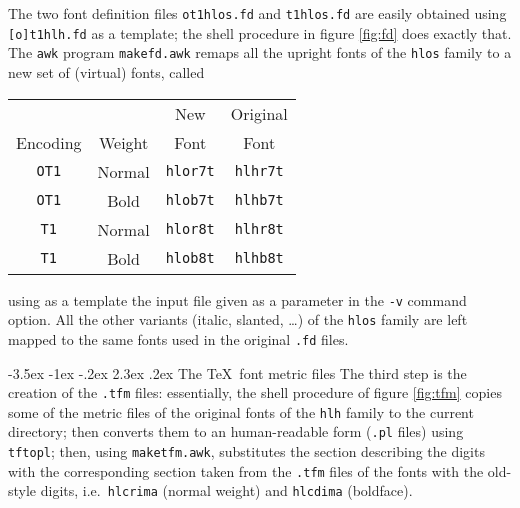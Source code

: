 \documentclass[a4paper]{article}
\makeatletter
\renewcommand{\section}{\@startsection {section}{1}{\z@}%
  {-3.5ex \@plus -1ex \@minus -.2ex}%
  {2.3ex \@plus.2ex}%
  {\normalfont\Large\sffamily\bfseries}}
\makeatother
\begin{document}
The two font definition files \verb|ot1hlos.fd| and
\verb|t1hlos.fd| are easily obtained using
\verb|[o]t1hlh.fd| as a template; the shell procedure in
figure \ref{fig:fd} does exactly that.
The \verb|awk| program \verb|makefd.awk| remaps all the
upright fonts of the \verb|hlos| family to a new set of
(virtual) fonts, called
\begin{center}
  \begin{tabular}{|c|c||c|c|}
    \hline
    & & New & Original \\
    Encoding & Weight & Font & Font \\
    \hline \hline
    \verb|OT1| & Normal & \verb|hlor7t| & \verb|hlhr7t| \\
    \verb|OT1| & Bold   & \verb|hlob7t| & \verb|hlhb7t| \\
    \verb|T1|  & Normal & \verb|hlor8t| & \verb|hlhr8t| \\
    \verb|T1|  & Bold   & \verb|hlob8t| & \verb|hlhb8t| \\
    \hline
  \end{tabular}
\end{center}
using as a template the input file given as a parameter in
the \verb|-v| command option.
All the other variants (italic, slanted, \ldots) of the
\verb|hlos| family are left mapped to the same fonts used in
the original \verb|.fd| files.

\section{The \TeX\ font metric files}
The third step is the creation of the \verb|.tfm| files:
essentially, the shell procedure of figure \ref{fig:tfm}
copies some of the metric files of the original fonts of the
\verb|hlh| family to the current directory; then converts
them to an human-readable form (\verb|.pl| files) using
\verb|tftopl|; then, using \verb|maketfm.awk|, substitutes
the section describing the digits with the corresponding
section taken from the \verb|.tfm| files of the fonts with
the old-style digits, i.e.\ \verb|hlcrima| (normal weight)
and \verb|hlcdima| (boldface).
\end{document}
